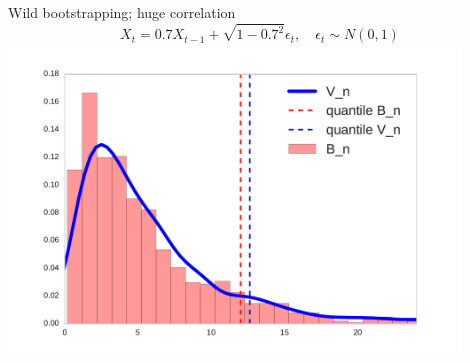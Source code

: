 \documentclass{beamer}
\begin{document}
 \begin{frame}{Wild bootstrapping; huge correlation}
\centering
 $$X_t = 0.7 X_{t-1} + \sqrt{1 - 0.7^2}\epsilon_t, \quad \epsilon_t \sim N(0,1)$$
 \includegraphics[width=0.9\textwidth]{./img/bootstrapWorks7.pdf}
\end{frame}
\end{document}
